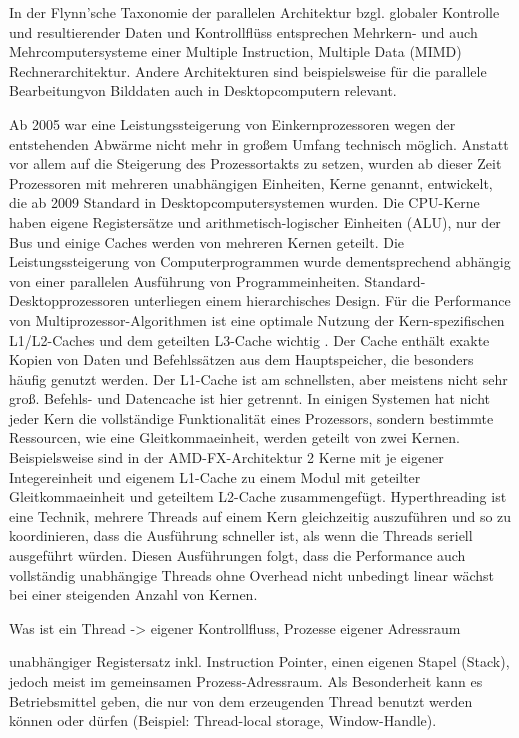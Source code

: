 \documentclass[a4paper,12pt,twoside]{article}
\begin{document}
In der Flynn’sche Taxonomie der parallelen Architektur bzgl. globaler Kontrolle und resultierender Daten und Kontrollflüss entsprechen Mehrkern- und auch Mehrcomputersysteme einer Multiple Instruction, Multiple Data (MIMD) Rechnerarchitektur. Andere Architekturen sind beispielsweise für die parallele Bearbeitungvon Bilddaten auch in Desktopcomputern relevant.

Ab 2005 war eine Leistungssteigerung von Einkernprozessoren wegen der entstehenden Abwärme nicht mehr in großem Umfang technisch möglich. Anstatt vor allem auf die Steigerung des Prozessortakts zu setzen, wurden ab dieser Zeit Prozessoren mit mehreren unabhängigen Einheiten, Kerne genannt, entwickelt, die ab 2009 Standard in Desktopcomputersystemen wurden. Die CPU-Kerne haben eigene Registersätze und arithmetisch-logischer Einheiten (ALU), nur der Bus und einige Caches werden von mehreren Kernen geteilt. Die Leistungssteigerung von Computerprogrammen wurde dementsprechend abhängig von einer parallelen Ausführung von Programmeinheiten. Standard-Desktopprozessoren unterliegen einem hierarchisches Design. Für die Performance von Multiprozessor-Algorithmen ist eine optimale Nutzung der Kern-spezifischen L1/L2-Caches und dem geteilten L3-Cache wichtig {\autocite{Rauber2013}}. Der Cache enthält exakte Kopien von Daten und Befehlssätzen aus dem Hauptspeicher, die besonders häufig genutzt werden. Der L1-Cache ist am schnellsten, aber meistens nicht sehr groß. Befehls- und Datencache ist hier getrennt. In einigen Systemen hat nicht jeder Kern die vollständige Funktionalität eines Prozessors, sondern bestimmte Ressourcen, wie eine Gleitkommaeinheit, werden geteilt von zwei Kernen. Beispielsweise sind in der AMD-FX-Architektur 2 Kerne mit je eigener Integereinheit und eigenem L1-Cache zu einem Modul mit geteilter Gleitkommaeinheit und geteiltem L2-Cache zusammengefügt. Hyperthreading ist eine Technik, mehrere Threads auf einem Kern gleichzeitig auszuführen und so zu koordinieren, dass die Ausführung schneller ist, als wenn die Threads seriell ausgeführt würden. Diesen Ausführungen folgt, dass die Performance auch vollständig unabhängige Threads ohne Overhead nicht unbedingt linear wächst bei einer steigenden Anzahl von Kernen. 

Was ist ein Thread -> eigener Kontrollfluss, Prozesse eigener Adressraum {\autocite[S. 95]{Rauber2013}}

unabhängiger Registersatz inkl. Instruction Pointer,
einen eigenen Stapel (Stack), jedoch meist im gemeinsamen Prozess-Adressraum.
Als Besonderheit kann es Betriebsmittel geben, die nur von dem erzeugenden Thread benutzt werden können oder dürfen (Beispiel: Thread-local storage, Window-Handle).
\end{document}
